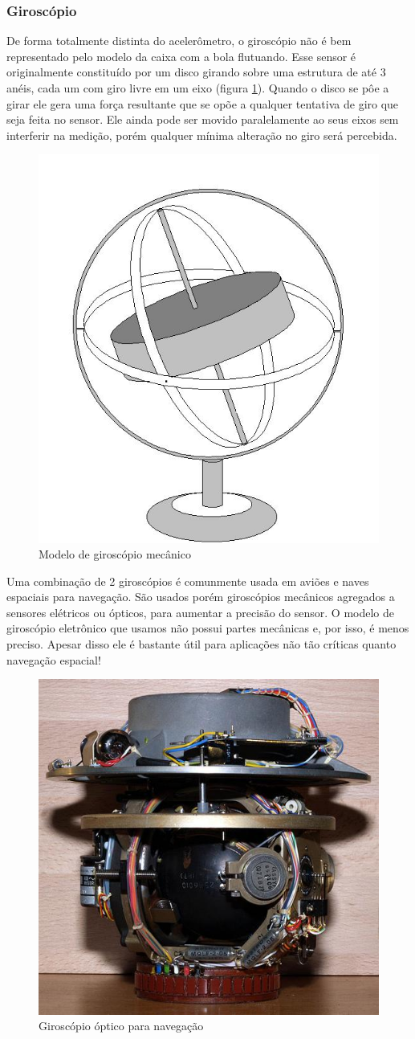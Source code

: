 \documentclass[a4paper,12pt]{article}
\begin{document}
\subsubsection{Giroscópio}

De forma totalmente distinta do acelerômetro, o giroscópio não é bem representado pelo modelo da caixa com a bola flutuando. Esse sensor é originalmente constituído por um disco girando sobre uma estrutura de até 3 anéis, cada um com giro livre em um eixo (figura \ref{giro}). Quando o disco se pôe a girar ele gera uma força resultante que se opõe a qualquer tentativa de giro que seja feita no sensor. Ele ainda pode ser movido paralelamente ao seus eixos sem interferir na medição, porém qualquer mínima alteração no giro será percebida.

\begin{figure}[H]
\centering
\includegraphics[width=.4\textwidth]{img/giro.jpg}
\caption{Modelo de giroscópio mecânico}
\label{giro}
\end{figure}

Uma combinação de 2 giroscópios é comunmente usada em aviões e naves espaciais para navegação. São usados porém giroscópios mecânicos agregados a sensores elétricos ou ópticos, para aumentar a precisão do sensor. O modelo de giroscópio eletrônico que usamos não possui partes mecânicas e, por isso, é menos preciso. Apesar disso ele é bastante útil para aplicações não tão críticas quanto navegação espacial!

\begin{figure}[H]
\centering
\includegraphics[width=.5\textwidth]{img/giro2.jpg}
\caption{Giroscópio óptico para navegação}
\label{giro2}
\end{figure}
\end{document}
